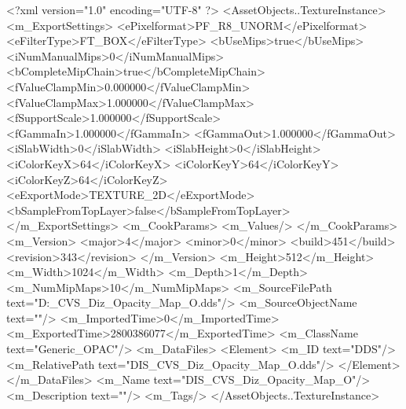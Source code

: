 <?xml version="1.0" encoding="UTF-8" ?>
<AssetObjects..TextureInstance>
	<m_ExportSettings>
		<ePixelformat>PF_R8_UNORM</ePixelformat>
		<eFilterType>FT_BOX</eFilterType>
		<bUseMips>true</bUseMips>
		<iNumManualMips>0</iNumManualMips>
		<bCompleteMipChain>true</bCompleteMipChain>
		<fValueClampMin>0.000000</fValueClampMin>
		<fValueClampMax>1.000000</fValueClampMax>
		<fSupportScale>1.000000</fSupportScale>
		<fGammaIn>1.000000</fGammaIn>
		<fGammaOut>1.000000</fGammaOut>
		<iSlabWidth>0</iSlabWidth>
		<iSlabHeight>0</iSlabHeight>
		<iColorKeyX>64</iColorKeyX>
		<iColorKeyY>64</iColorKeyY>
		<iColorKeyZ>64</iColorKeyZ>
		<eExportMode>TEXTURE_2D</eExportMode>
		<bSampleFromTopLayer>false</bSampleFromTopLayer>
	</m_ExportSettings>
	<m_CookParams>
		<m_Values/>
	</m_CookParams>
	<m_Version>
		<major>4</major>
		<minor>0</minor>
		<build>451</build>
		<revision>343</revision>
	</m_Version>
	<m_Height>512</m_Height>
	<m_Width>1024</m_Width>
	<m_Depth>1</m_Depth>
	<m_NumMipMaps>10</m_NumMipMaps>
	<m_SourceFilePath text="D:\CivVIMods\Textures\DIS_CVS_Diz_Opacity_Map_O.dds"/>
	<m_SourceObjectName text=""/>
	<m_ImportedTime>0</m_ImportedTime>
	<m_ExportedTime>2800386077</m_ExportedTime>
	<m_ClassName text="Generic_OPAC"/>
	<m_DataFiles>
		<Element>
			<m_ID text="DDS"/>
			<m_RelativePath text="DIS_CVS_Diz_Opacity_Map_O.dds"/>
		</Element>
	</m_DataFiles>
	<m_Name text="DIS_CVS_Diz_Opacity_Map_O"/>
	<m_Description text=""/>
	<m_Tags/>
</AssetObjects..TextureInstance>

